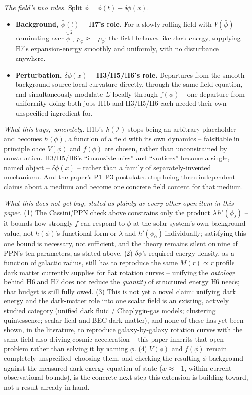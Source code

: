 \documentclass[12pt, a4paper]{article}
\begin{document}
\emph{The field's two roles.} Split $\phi=\bar\phi(t)+\delta\phi(x)$.
\begin{itemize}
  \item \textbf{Background, $\bar\phi(t)$ -- H7's role.} For a slowly
    rolling field with $V(\bar\phi)$ dominating over
    $\dot{\bar\phi}^2$, $p_{\bar\phi}\approx-\rho_{\bar\phi}$: the
    field behaves like dark energy, supplying H7's expansion-energy
    smoothly and uniformly, with no disturbance anywhere.
  \item \textbf{Perturbation, $\delta\phi(x)$ -- H3/H5/H6's role.}
    Departures from the smooth background source local curvature
    directly, through the same field equation, and simultaneously
    modulate $\Sigma$ locally through $f(\phi)$ -- one departure from
    uniformity doing both jobs H1b and H3/H5/H6 each needed their own
    unspecified ingredient for.
\end{itemize}

\emph{What this buys, concretely.} H1b's $h(\mathcal{I})$ stops being
an arbitrary placeholder and becomes $h(\phi)$, a function of a field
with its own dynamics -- falsifiable in principle once $V(\phi)$ and
$f(\phi)$ are chosen, rather than unconstrained by construction.
H3/H5/H6's ``inconsistencies'' and ``vortices'' become a single,
named object -- $\delta\phi(x)$ -- rather than a family of
separately-invented mechanisms. And the paper's P1--P3 postulates
stop being three independent claims about a medium and become one
concrete field content for that medium.

\emph{What this does not yet buy, stated as plainly as every other
open item in this paper.} (1) The Cassini/PPN check above constrains
only the product $\lambda\,h'(\phi_0)$ -- it bounds how strongly $f$
can respond to $\phi$ at the solar system's own background value, not
$h(\phi)$'s functional form or $\lambda$ and $h'(\phi_0)$
individually; satisfying this one bound is necessary, not sufficient,
and the theory remains silent on nine of PPN's ten parameters, as
stated above. (2)
$\delta\phi$'s required energy density, as a function of galactic
radius, still has to reproduce the same $M(r)\propto r$ profile dark
matter currently supplies for flat rotation curves -- unifying the
\emph{ontology} behind H6 and H7 does not reduce the
\emph{quantity} of structured energy H6 needs; that budget is still
fully owed. (3) This is not yet a novel claim: unifying dark energy
and the dark-matter role into one scalar field is an existing,
actively studied category (unified dark fluid / Chaplygin-gas models;
clustering quintessence; scalar-field and BEC dark matter), and none
of these has yet been shown, in the literature, to reproduce
galaxy-by-galaxy rotation curves with the same field also driving
cosmic acceleration -- this paper inherits that open problem rather
than solving it by naming $\phi$. (4) $V(\phi)$ and $f(\phi)$ remain
completely unspecified; choosing them, and checking the resulting
$\bar\phi$ background against the measured dark-energy equation of
state ($w\approx-1$, within current observational bounds), is the
concrete next step this extension is building toward, not a result
already in hand.
\end{document}
